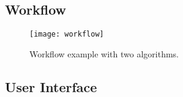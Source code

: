 \subsection{Workflow}


\begin{figure}[h]
  \centering
      \texttt{[image: workflow]}
  \caption{Workflow example with two algorithms.}
  \label{fig:Workflow}
\end{figure}

\subsection{User Interface}
